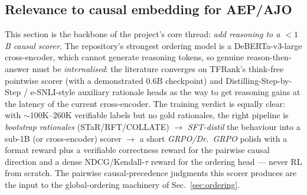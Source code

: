 \subsection{Relevance to causal embedding for AEP/AJO}
This section is the backbone of the project's core thread: \emph{add reasoning to
a $<\!1$B causal scorer}. The repository's strongest ordering model is a
DeBERTa-v3-large cross-encoder, which cannot generate reasoning tokens, so genuine
reason-then-answer must be \emph{internalised}: the literature converges on
TFRank's think-free pointwise scorer (with a demonstrated 0.6B checkpoint) and
Distilling-Step-by-Step / e-SNLI-style auxiliary rationale heads as the way to
get reasoning gains at the latency of the current cross-encoder. The training
verdict is equally clear: with ${\sim}100$K--260K verifiable labels but no gold
rationales, the right pipeline is \emph{bootstrap rationales} (STaR/RFT/COLLATE)
$\rightarrow$ \emph{SFT-distil} the behaviour into a sub-1B (or cross-encoder)
scorer $\rightarrow$ a short \emph{GRPO/Dr.\ GRPO} polish with a format reward plus
a verifiable correctness reward for the pairwise causal direction and a dense
NDCG/Kendall-$\tau$ reward for the ordering head --- never RL from scratch. The
pairwise causal-precedence judgments this scorer produces are the input to the
global-ordering machinery of Sec.~\ref{sec:ordering}.
